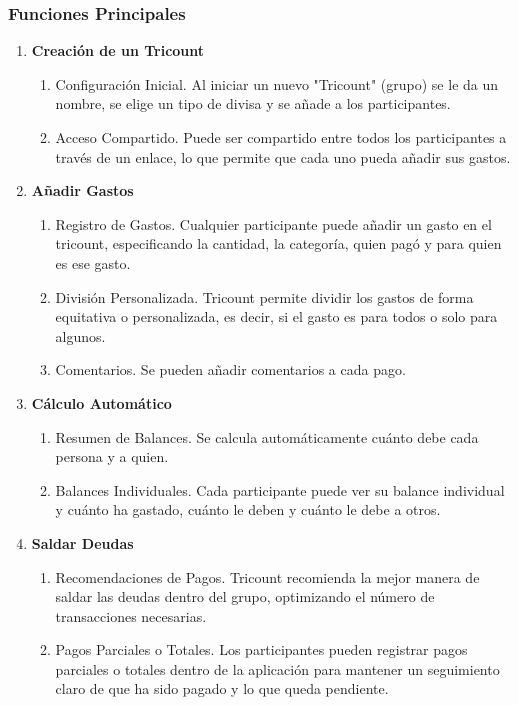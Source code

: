 \subsubsection{Funciones Principales}
\label{subsubsec:funciones}
\begin{enumerate}
    \item \textbf{Creación de un Tricount}
    \begin{enumerate}
        \item Configuración Inicial. Al iniciar un nuevo "Tricount" (grupo) se le da un nombre, se elige un tipo de divisa y se añade a los participantes.
        \item Acceso Compartido. Puede ser compartido entre todos los participantes a través de un enlace, lo que permite que cada uno pueda añadir sus gastos.
    \end{enumerate}
    \item \textbf{Añadir Gastos}
    \begin{enumerate}
        \item Registro de Gastos. Cualquier participante puede añadir un gasto en el tricount, especificando la cantidad, la categoría,
        quien pagó y para quien es ese gasto.
        \item División Personalizada. Tricount permite dividir los gastos de forma equitativa o personalizada, es decir, si el gasto es para todos o solo para algunos. 
        \item Comentarios. Se pueden añadir comentarios a cada pago.
    \end{enumerate}
    \item \textbf{Cálculo Automático}
    \begin{enumerate}
        \item Resumen de Balances. Se calcula automáticamente cuánto debe cada persona y a quien. 
        \item Balances Individuales. Cada participante puede ver su balance individual y cuánto ha gastado, cuánto le deben y cuánto le debe a otros.
    \end{enumerate}
    \item \textbf{Saldar Deudas}
    \begin{enumerate}
        \item Recomendaciones de Pagos. Tricount recomienda la mejor manera de saldar las deudas dentro del grupo, optimizando el número de 
        transacciones necesarias.
        \item Pagos Parciales o Totales. Los participantes pueden registrar pagos parciales o totales dentro de la aplicación para mantener un
        seguimiento claro de que ha sido pagado y lo que queda pendiente.
    \end{enumerate}
\end{enumerate}


